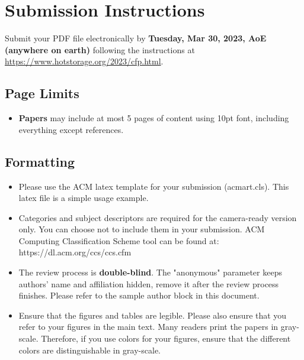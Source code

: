 \documentclass[sigconf,anonymous,10pt]{acmart}
\begin{document}
\maketitle

\sloppy

\section{Submission Instructions}

Submit your PDF file electronically by \textbf{Tuesday, Mar 30, 2023, AoE (anywhere on earth)} following the instructions at \url{https://www.hotstorage.org/2023/cfp.html}.

\subsection{Page Limits}
\begin{itemize}
	\item \textbf{Papers} may include at most 5 pages of content using 10pt font, including everything except references.
\end{itemize}

\subsection{Formatting}
\begin{itemize}
	\item
	Please use the ACM latex template for your submission (acmart.cls). This latex file is a simple usage example.
	
	\item
	Categories and subject descriptors are required for the camera-ready version only. You can choose not to include them in your submission. ACM Computing Classification Scheme tool can be found at: https://dl.acm.org/ccs/ccs.cfm
	
	\item
	The review process is \textbf{double-blind}. The "anonymous" parameter keeps authors' name and affiliation hidden, remove it after the review process finishes. Please refer to the sample author block in this document.
	
	\item
	Ensure that the figures and tables are legible.  Please also ensure that you refer to your figures in the main text. Many readers print the papers in gray-scale. Therefore, if you use colors for your figures, ensure that the different colors are distinguishable in gray-scale.
\end{itemize}
\end{document}
